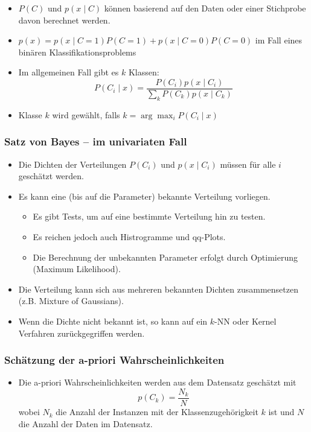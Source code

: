 \documentclass{scrartcl}
\begin{document}
\begin{itemize}
	\item $ P(C) $ und $ p(x \mid C) $ können basierend auf den Daten oder 
	einer Stichprobe davon berechnet werden.
	\item $ p(x) = p(x \mid C=1) P(C=1) + p(x \mid C=0) P(C=0) $ im Fall eines 
	binären Klassifikationsproblems
	\item Im allgemeinen Fall gibt es $ k $ Klassen:
	\[ P(C_i \mid x) = \frac{P(C_i) p(x \mid C_i)}{\sum_k P(C_k) p(x \mid C_k)} 
	\]
	\item Klasse $ k $ wird gewählt, falls $ k = \arg \max_i P(C_i \mid x) $
\end{itemize}

\subsubsection{Satz von Bayes – im univariaten Fall}

\begin{itemize}
	\item Die Dichten der Verteilungen $ P(C_i) $ und $ p(x \mid C_i) $ müssen 
	für alle $ i $ geschätzt werden.
	\item Es kann eine (bis auf die Parameter) bekannte Verteilung vorliegen.
	\begin{itemize}
		\item Es gibt Tests, um auf eine bestimmte Verteilung hin zu testen.
		\item Es reichen jedoch auch Histrogramme und qq-Plots.
		\item Die Berechnung der unbekannten Parameter erfolgt durch 
		Optimierung (Maximum Likelihood).
	\end{itemize}
	\item Die Verteilung kann sich aus mehreren bekannten Dichten 
	zusammensetzen (z.B. Mixture of Gaussians).
	\item Wenn die Dichte nicht bekannt ist, so kann auf ein $ k $-NN oder 
	Kernel Verfahren zurückgegriffen werden.
\end{itemize}

\subsubsection{Schätzung der a-priori Wahrscheinlichkeiten}

\begin{itemize}
	\item Die a-priori Wahrscheinlichkeiten werden aus dem Datensatz geschätzt 
	mit
	\[ p(C_k) = \frac{N_k}{N} \]
	wobei $ N_k $ die Anzahl der Instanzen mit der Klassenzugehörigkeit $ k $ 
	ist und $ N $ die Anzahl der Daten im Datensatz.
\end{itemize}
\end{document}
